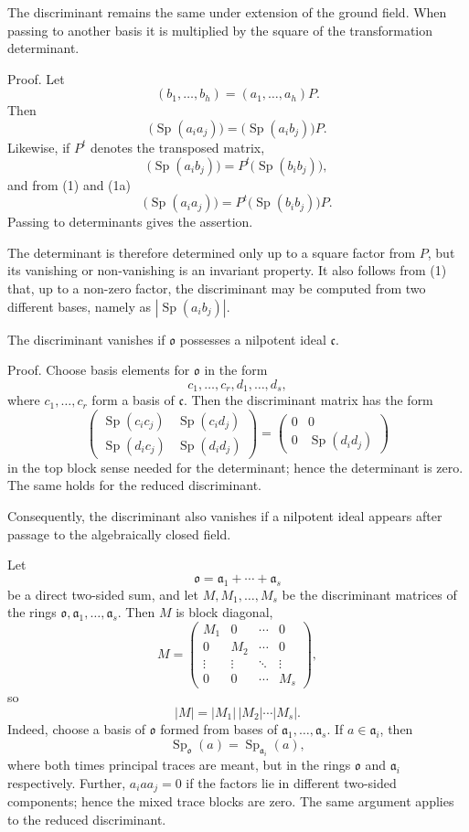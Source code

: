 \documentclass[11pt]{article}
\providecommand{\mo}{\mathfrak{o}}
\providecommand{\ma}{\mathfrak{a}}
\providecommand{\mc}{\mathfrak{c}}
\begin{document}
The discriminant remains the same under extension of the ground field. When passing to another basis it is multiplied by the square of the transformation determinant.

Proof. Let
\[
        (b_1,\ldots,b_h)=(a_1,\ldots,a_h)P.
\]
Then
\[
        \bigl(\operatorname{Sp}(a_i a_j)\bigr)=\bigl(\operatorname{Sp}(a_i b_j)\bigr)P.       \tag{1}
\]
Likewise, if $P^t$ denotes the transposed matrix,
\[
        \bigl(\operatorname{Sp}(a_i b_j)\bigr)=P^t\bigl(\operatorname{Sp}(b_i b_j)\bigr),      \tag{1a}
\]
and from (1) and (1a)
\[
        \bigl(\operatorname{Sp}(a_i a_j)\bigr)=P^t\bigl(\operatorname{Sp}(b_i b_j)\bigr)P.
\]
Passing to determinants gives the assertion.

The determinant is therefore determined only up to a square factor from $P$, but its vanishing or non-vanishing is an invariant property. It also follows from (1) that, up to a non-zero factor, the discriminant may be computed from two different bases, namely as $|\operatorname{Sp}(a_i b_j)|$.

The discriminant vanishes if $\mo$ possesses a nilpotent ideal $\mc$.

Proof. Choose basis elements for $\mo$ in the form
\[
        c_1,\ldots,c_r,d_1,\ldots,d_s,
\]
where $c_1,\ldots,c_r$ form a basis of $\mc$. Then the discriminant matrix has the form
\[
        \begin{pmatrix}
        \operatorname{Sp}(c_i c_j)&\operatorname{Sp}(c_i d_j)\\
        \operatorname{Sp}(d_i c_j)&\operatorname{Sp}(d_i d_j)
        \end{pmatrix}
        =
        \begin{pmatrix}
        0&0\\
        0&\operatorname{Sp}(d_i d_j)
        \end{pmatrix}
\]
in the top block sense needed for the determinant; hence the determinant is zero. The same holds for the reduced discriminant.

Consequently, the discriminant also vanishes if a nilpotent ideal appears after passage to the algebraically closed field.

Let
\[
        \mo=\ma_1+\cdots+\ma_s
\]
be a direct two-sided sum, and let $M,M_1,\ldots,M_s$ be the discriminant matrices of the rings $\mo,\ma_1,\ldots,\ma_s$. Then $M$ is block diagonal,
\[
        M=\begin{pmatrix}
        M_1&0&\cdots&0\\
        0&M_2&\cdots&0\\
        \vdots&\vdots&\ddots&\vdots\\
        0&0&\cdots&M_s
        \end{pmatrix},
\]
so
\[
        |M|=|M_1|\,|M_2|\cdots |M_s|.
\]
Indeed, choose a basis of $\mo$ formed from bases of $\ma_1,\ldots,\ma_s$. If $a\in\ma_i$, then
\[
        \operatorname{Sp}_\mo(a)=\operatorname{Sp}_{\ma_i}(a),
\]
where both times principal traces are meant, but in the rings $\mo$ and $\ma_i$ respectively. Further, $a_i a a_j=0$ if the factors lie in different two-sided components; hence the mixed trace blocks are zero. The same argument applies to the reduced discriminant.
\end{document}
